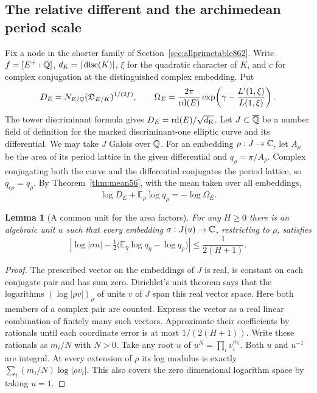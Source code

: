 \documentclass[a4paper,11pt]{article}
\newtheorem{lemma}[proposition]{Lemma}
\theoremstyle{definition}
\theoremstyle{remark}
\numberwithin{equation}{section}
\begin{document}
\subsection{The relative different and the archimedean period scale}
\label{sec:jetscale863}
Fix a node in the shorter family of Section~\ref{sec:allprimetable862}.
Write \(f=[E^+:\mathbb Q]\), \(d_{\rm K}=|\operatorname{disc}(K)|\),
\(\xi\) for the quadratic character of \(K\), and \(c\) for complex
conjugation at the distinguished complex embedding. Put
\[
 D_E=N_{E/\mathbb Q}(\mathfrak D_{E/K})^{1/(2f)},\qquad
 \Omega_E=\frac{2\pi}{\operatorname{rd}(E)}
                  \exp\!\left(\gamma-\frac{L'(1,\xi)}{L(1,\xi)}\right).
\]
The tower discriminant formula gives
\(D_E=\operatorname{rd}(E)/\sqrt{d_{\rm K}}\).
Let \(J\subset\overline{\mathbb Q}\) be a number field of definition for
the marked discriminant-one elliptic curve and its differential.
We may take \(J\) Galois over \(\mathbb Q\). For an embedding
\(\rho:J\to\mathbb C\), let \(A_\rho\) be the area of its period lattice
in the given differential and \(q_\rho=\pi/A_\rho\). Complex
conjugating both the curve and the differential conjugates the
period lattice, so \(q_{c\rho}=q_\rho\). By
Theorem~\ref{thm:mean56}, with the mean taken over all embeddings,
\begin{equation}
 \log D_E+\mathbb E_\rho\log q_\rho=-\log\Omega_E .
 \label{eq:areamean863}
\end{equation}

\begin{lemma}[A common unit for the area factors]
\leavevmode\label{lem:unitarea863}
For any \(H\ge0\) there is an algebraic unit \(u\) such that every
embedding \(\sigma:J(u)\to\mathbb C\), restricting to \(\rho\), satisfies
\[
 \left|\log|\sigma u|-\tfrac12
        \big(\mathbb E_\eta\log q_\eta-\log q_\rho\big)\right|
            \le \frac{1}{2(H+1)} .
\]
\end{lemma}
\begin{proof}
The prescribed vector on the embeddings of \(J\) is real, is
constant on each conjugate pair and has sum zero. Dirichlet's
unit theorem says that the logarithms \((\log|\rho v|)_\rho\)
of units \(v\) of \(J\) span this real vector space. Here both
members of a complex pair are counted. Express the vector as a
real linear combination of finitely many such vectors. Approximate
their coefficients by rationals until each coordinate error is at
most \(1/(2(H+1))\). Write these rationals as \(m_i/N\) with
\(N>0\). Take any root \(u\) of \(u^N=\prod_i v_i^{m_i}\).
Both \(u\) and \(u^{-1}\) are integral. At every extension of
\(\rho\) its log modulus is exactly
\(\sum_i(m_i/N)\log|\rho v_i|\). This also covers the zero
dimensional logarithm space by taking \(u=1\).
\end{proof}
\end{document}
